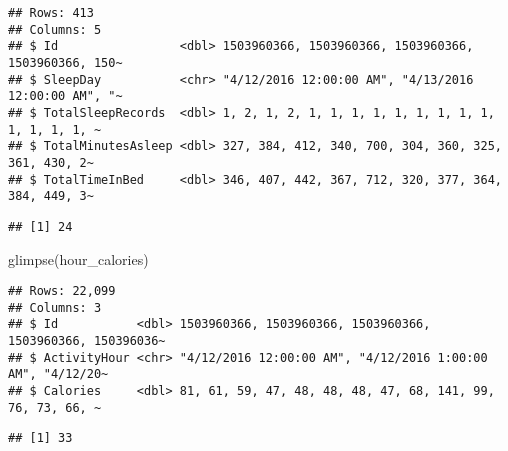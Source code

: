\documentclass[
]{article}
\newenvironment{Shaded}{\begin{snugshade}}{\end{snugshade}}
\newcommand{\FunctionTok}[1]{\textcolor[rgb]{0.00,0.00,0.00}{#1}}
\newcommand{\NormalTok}[1]{#1}
\newcommand{\SpecialCharTok}[1]{\textcolor[rgb]{0.00,0.00,0.00}{#1}}
\begin{document}
\begin{verbatim}
## Rows: 413
## Columns: 5
## $ Id                 <dbl> 1503960366, 1503960366, 1503960366, 1503960366, 150~
## $ SleepDay           <chr> "4/12/2016 12:00:00 AM", "4/13/2016 12:00:00 AM", "~
## $ TotalSleepRecords  <dbl> 1, 2, 1, 2, 1, 1, 1, 1, 1, 1, 1, 1, 1, 1, 1, 1, 1, ~
## $ TotalMinutesAsleep <dbl> 327, 384, 412, 340, 700, 304, 360, 325, 361, 430, 2~
## $ TotalTimeInBed     <dbl> 346, 407, 442, 367, 712, 320, 377, 364, 384, 449, 3~
\end{verbatim}

\begin{Shaded}
\end{Shaded}

\begin{verbatim}
## [1] 24
\end{verbatim}

\begin{Shaded}
\begin{Highlighting}[]
\FunctionTok{glimpse}\NormalTok{(hour\_calories)}
\end{Highlighting}
\end{Shaded}

\begin{verbatim}
## Rows: 22,099
## Columns: 3
## $ Id           <dbl> 1503960366, 1503960366, 1503960366, 1503960366, 150396036~
## $ ActivityHour <chr> "4/12/2016 12:00:00 AM", "4/12/2016 1:00:00 AM", "4/12/20~
## $ Calories     <dbl> 81, 61, 59, 47, 48, 48, 48, 47, 68, 141, 99, 76, 73, 66, ~
\end{verbatim}

\begin{Shaded}
\end{Shaded}

\begin{verbatim}
## [1] 33
\end{verbatim}

\begin{Shaded}
\end{Shaded}
\end{document}
